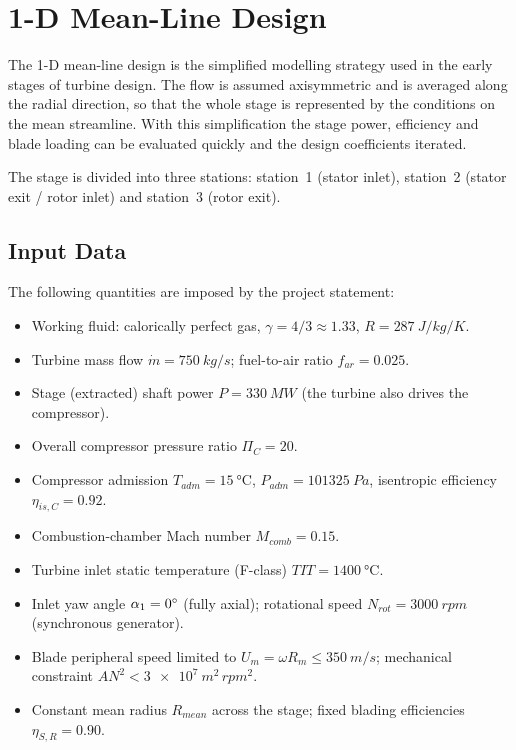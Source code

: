 \chapter{1-D Mean-Line Design}

The 1-D mean-line design is the simplified modelling strategy used in the early
stages of turbine design. The flow is assumed axisymmetric and is averaged along
the radial direction, so that the whole stage is represented by the conditions on
the mean streamline. With this simplification the stage power, efficiency and
blade loading can be evaluated quickly and the design coefficients iterated.

The stage is divided into three stations: station~1 (stator inlet), station~2
(stator exit / rotor inlet) and station~3 (rotor exit).

\section{Input Data}

The following quantities are imposed by the project statement:

\begin{itemize}
    \item Working fluid: calorically perfect gas, $\gamma = 4/3 \approx 1.33$,
          $R = \SI{287}{J/kg/K}$.
    \item Turbine mass flow $\dot m = \SI{750}{kg/s}$; fuel-to-air ratio
          $f_{ar}=0.025$.
    \item Stage (extracted) shaft power $P = \SI{330}{MW}$ (the turbine also
          drives the compressor).
    \item Overall compressor pressure ratio $\Pi_C = 20$.
    \item Compressor admission $T_{adm} = \SI{15}{\degreeCelsius}$,
          $P_{adm} = \SI{101325}{Pa}$, isentropic efficiency $\eta_{is,C}=0.92$.
    \item Combustion-chamber Mach number $M_{comb}=0.15$.
    \item Turbine inlet static temperature (F-class) $TIT = \SI{1400}{\degreeCelsius}$.
    \item Inlet yaw angle $\alpha_1 = 0^\circ$ (fully axial); rotational speed
          $N_{rot}=\SI{3000}{rpm}$ (synchronous generator).
    \item Blade peripheral speed limited to $U_m = \omega R_m \le \SI{350}{m/s}$;
          mechanical constraint $AN^2 < \SI{3e7}{m^2\,rpm^2}$.
    \item Constant mean radius $R_{mean}$ across the stage; fixed blading
          efficiencies $\eta_{S,R}=0.90$.
\end{itemize}

